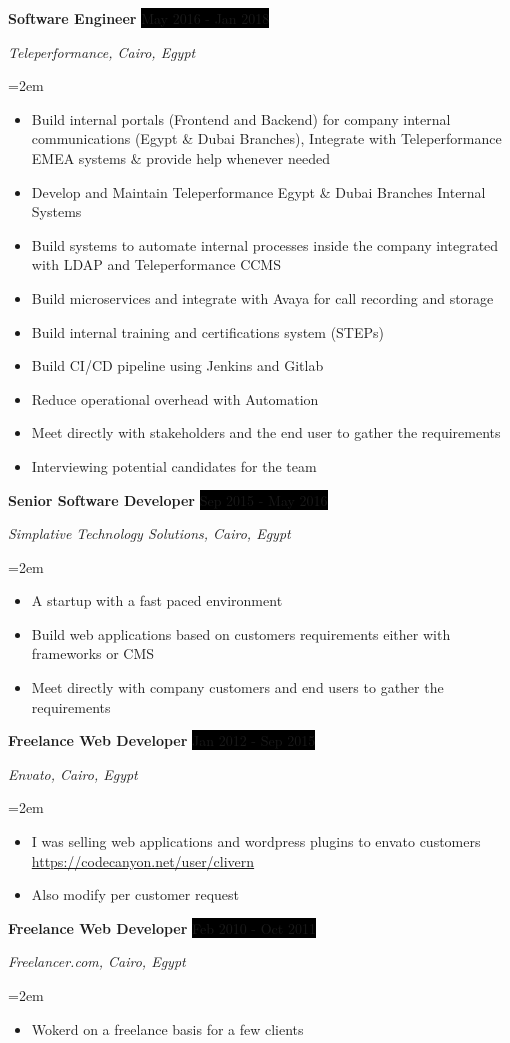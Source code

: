 \documentclass[paper=a4,fontsize=11pt]{scrartcl} %
\newcommand{\sepspace}{\vspace*{1em}}		%
\newcommand{\EducationEntry}[4]{
		\noindent \textbf{#1} \hfill      %
		\colorbox{Black}{%
			\parbox{6em}{%
			\hfill\color{White}#2}} \par  %
		\noindent \textit{#3} \par        %
		\noindent\hangindent=2em\hangafter=0 \small #4 %
		\normalsize \par}
\newcommand{\WorkEntry}[4]{				  %
		\noindent \textbf{#1} \hfill      %
		\colorbox{Black}{\color{White}#2} \par  %
		\noindent \textit{#3} \par              %
		\noindent\hangindent=2em\hangafter=0 \small #4 %
		\normalsize \par}
\begin{document}
\WorkEntry{Software Engineer}{May 2016 - Jan 2018}{Teleperformance, Cairo, Egypt}{\begin{itemize}
\item Build internal portals (Frontend and Backend) for company internal communications (Egypt \& Dubai Branches), Integrate with Teleperformance EMEA systems \& provide help whenever needed
\item Develop and Maintain Teleperformance Egypt \& Dubai Branches Internal Systems
\item Build systems to automate internal processes inside the company integrated with LDAP and Teleperformance CCMS
\item Build microservices and integrate with Avaya for call recording and storage
\item Build internal training and certifications system (STEPs)
\item Build CI/CD pipeline using Jenkins and Gitlab
\item Reduce operational overhead with Automation
\item Meet directly with stakeholders and the end user to gather the requirements
\item Interviewing potential candidates for the team
\end{itemize}}
\sepspace

\WorkEntry{Senior Software Developer}{Sep 2015 - May 2016}{Simplative Technology Solutions, Cairo, Egypt}{\begin{itemize}
\item A startup with a fast paced environment
\item Build web applications based on customers requirements either with frameworks or CMS
\item Meet directly with company customers and end users to gather the requirements
\end{itemize}}
\sepspace

\WorkEntry{Freelance Web Developer}{Jan 2012 - Sep 2015}{Envato, Cairo, Egypt}{\begin{itemize}
\item I was selling web applications and wordpress plugins to envato customers \url{https://codecanyon.net/user/clivern}
\item Also modify per customer request
\end{itemize}}
\sepspace

\WorkEntry{Freelance Web Developer}{Feb 2010 - Oct 2011}{Freelancer.com, Cairo, Egypt}{\begin{itemize}
\item Wokerd on a freelance basis for a few clients
\end{itemize}}
\sepspace
\end{document}
